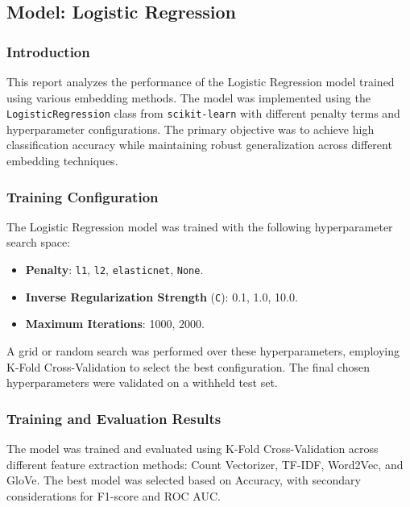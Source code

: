 \subsection{Model: Logistic Regression}

\subsubsection{Introduction}
This report analyzes the performance of the Logistic Regression model trained using various embedding methods. The model was implemented using the \texttt{LogisticRegression} class from \texttt{scikit-learn} with different penalty terms and hyperparameter configurations. The primary objective was to achieve high classification accuracy while maintaining robust generalization across different embedding techniques.

\subsubsection{Training Configuration}
The Logistic Regression model was trained with the following hyperparameter search space:
\begin{itemize}
    \item \textbf{Penalty}: \texttt{l1}, \texttt{l2}, \texttt{elasticnet}, \texttt{None}.
    \item \textbf{Inverse Regularization Strength} (\texttt{C}): 0.1, 1.0, 10.0.
    \item \textbf{Maximum Iterations}: 1000, 2000.
\end{itemize}


A grid or random search was performed over these hyperparameters, employing K-Fold Cross-Validation to select the best configuration. The final chosen hyperparameters were validated on a withheld test set.

\subsubsection{Training and Evaluation Results}
The model was trained and evaluated using K-Fold Cross-Validation across different feature extraction methods: Count Vectorizer, TF-IDF, Word2Vec, and GloVe. The best model was selected based on Accuracy, with secondary considerations for F1-score and ROC AUC.

